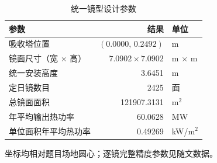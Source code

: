 \begin{table}[H]
\centering\small
\caption{统一镜型设计参数}\label{tab:q2design}
\begin{tabular}{lrl}
\toprule
参数 & 结果 & 单位\\\midrule
吸收塔位置 & $(0.0000,\,0.2492)$ & m\\
镜面尺寸（宽 $\times$ 高） & $7.0902\times7.0902$ & m $\times$ m\\
统一安装高度 & 3.6451 & m\\
定日镜数目 & 2425 & 面\\
总镜面面积 & 121907.3131 & m$^2$\\
年平均输出热功率 & 60.0628 & MW\\
单位面积年平均热功率 & 0.49269 & kW/m$^2$\\
\bottomrule
\end{tabular}
\par\vspace{3pt}\begin{minipage}{.95\linewidth}\footnotesize 坐标均相对题目场地圆心；逐镜完整精度参数见随文数据。\end{minipage}
\end{table}
